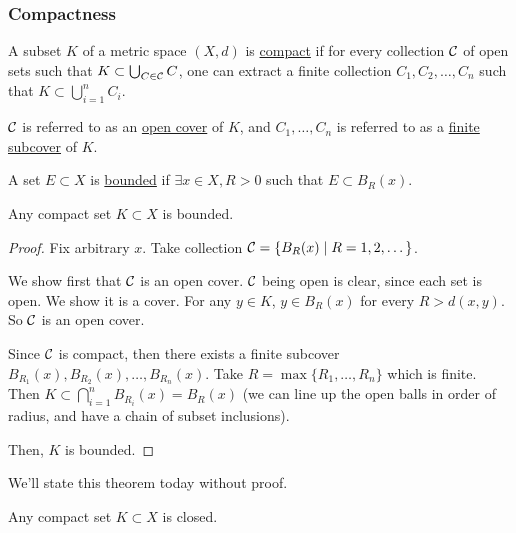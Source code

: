 \subsubsection{Compactness}
\begin{definition}[Compactness]
    A subset $K$ of a metric space $(X, d)$ is \ul{compact} if for every collection $\mathcal C$ of open sets such that $K\subset \bigcup_{C\in \mathcal C}C$, one can extract a finite collection $C_1, C_2, \dots, C_n$ such that $K\subset \bigcup_{i=1}^n C_i$.

    $\mathcal C$ is referred to as an \ul{open cover} of $K$, and $C_1, \dots, C_n$ is referred to as a \ul{finite subcover} of $K$.
\end{definition}

\begin{definition}[Boundedness]
    A set $E\subset X$ is \ul{bounded} if $\exists x\in X, R > 0$ such that $E\subset B_R(x)$.
\end{definition}
\begin{theorem}
    Any compact set $K\subset X$ is bounded.
\end{theorem}
\begin{proof}
    Fix arbitrary $x$. Take collection $\mathcal C = \left\{ B_R(x) \mid R = 1, 2, \dots \right\}$.

    We show first that $\mathcal C$ is an open cover. $\mathcal C$ being open is clear, since each set is open. We show it is a cover. For any $y\in K$, $y\in B_R(x)$ for every $R > d(x, y)$. So $\mathcal C$ is an open cover.

    Since $\mathcal C$ is compact, then there exists a finite subcover $B_{R_1}(x), B_{R_2}(x), \dots, B_{R_n}(x)$. Take $R = \max\{R_1, \dots, R_n\}$ which is finite. Then $K\subset \bigcap_{i=1}^n B_{R_i}(x) = B_R(x)$ (we can line up the open balls in order of radius, and have a chain of subset inclusions).

    Then, $K$ is bounded.
\end{proof}

We'll state this theorem today without proof.
\begin{theorem}
    Any compact set $K\subset X$ is closed.
\end{theorem}